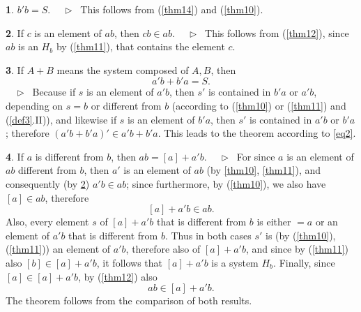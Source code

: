 \documentclass[leqno,hidelinks,a4paper]{article}
\theoremstyle{definition}
\newtheorem{sat}{\protect\satname}
\newcommand{\satname}{}
\renewcommand{\satname}{\hspace{-4pt}. Satz}%
\renewcommand{\satname}{\hspace{-4pt}. Theorem}%
\newcommand\Beweis{\newline $ \phantom{'.'} \rhd \ $}%
\newcommand{\partof}{\in}
\begin{document}
\begin{paracol}{2}
\begin{sat}\label{thm15}
$b' b = S$.
\Beweis
This follows from (\ref{thm14}) and (\ref{thm10}).
\end{sat}

\begin{sat}\label{thm16}
If $c$ is an element of $ab$, then $cb \partof ab$.
\Beweis
This follows from (\ref{thm12}), since $ab$ is an $H_b$ by (\ref{thm11}), that
contains the element $c$.
\end{sat}

\begin{sat}\label{thm17}
If $A + B$ means the system composed of $A, B$, then
\[
	a'b + b'a = S.
\]
\vspace*{-16pt}%
\Beweis
Because if $s$ is an element of $a'b$, then $s'$ is contained in $b'a$ or $a'b$,
depending on $s = b$ or different from $b$ (according to (\ref{thm10}) or
(\ref{thm11}) and (\ref{def3}.II)), and likewise if $s$ is an element of $b'a$,
then $s'$ is contained in $a'b$ or $b'a$; therefore $(a'b + b'a)' \partof a'b + b'a$.
This leads to the theorem according to \eqref{eq2}.
\end{sat}

\begin{sat}\label{thm18}
If $a$ is different from $b$, then $ab = [a] + a'b$.
\Beweis
For since $a$ is an element of $ab$ different from $b$, then $a'$ is an element
of $ab$ (by \ref{thm10}, \ref{thm11}), and consequently (by \ref{thm16})
$a'b \partof ab$; since furthermore, by (\ref{thm10}), we also have $[a]
\partof ab$, therefore
\[
	[a] + a'b \partof ab.
\]
Also, every element $s$ of $[a] + a'b$ that is different from $b$ is either
$= a$ or an element of $a'b$ that is different from $b$. Thus in both cases $s'$
is (by (\ref{thm10}), (\ref{thm11})) an element of $a'b$, therefore also of
$[a]+ a'b$, and since by (\ref{thm11}) also $[b] \partof [a] + a'b$, it follows
that $[a] + a'b$ is a system $H_b$. Finally, since $[a] \partof [a] + a'b$, by
(\ref{thm12}) also
\[
	ab \partof [a] + a' b.
\]
The theorem follows from the comparison of both results.
\end{sat}

\end{paracol}
\end{document}
